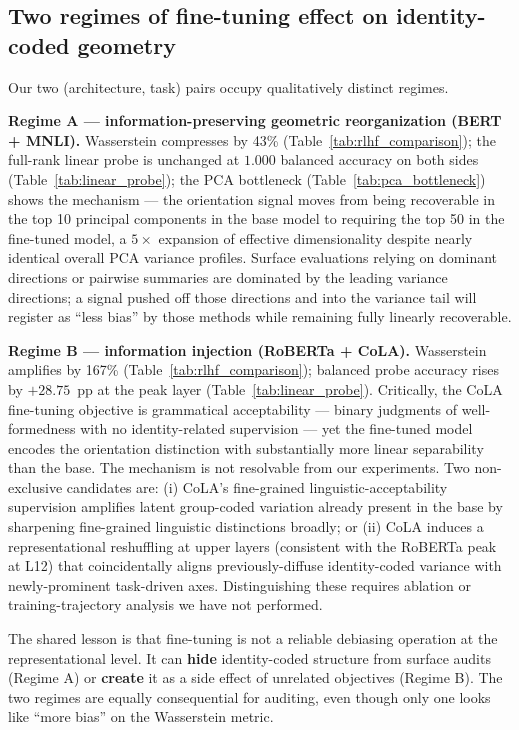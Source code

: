 \documentclass[11pt]{article}
\begin{document}
\subsection{Two regimes of fine-tuning effect on identity-coded geometry}\label{sec:regimes}

Our two (architecture, task) pairs occupy qualitatively distinct regimes.

\textbf{Regime A --- information-preserving geometric reorganization (BERT + MNLI).} Wasserstein compresses by 43\% (Table~\ref{tab:rlhf_comparison}); the full-rank linear probe is unchanged at $1.000$ balanced accuracy on both sides (Table~\ref{tab:linear_probe}); the PCA bottleneck (Table~\ref{tab:pca_bottleneck}) shows the mechanism --- the orientation signal moves from being recoverable in the top 10 principal components in the base model to requiring the top 50 in the fine-tuned model, a $5\times$ expansion of effective dimensionality despite nearly identical overall PCA variance profiles. Surface evaluations relying on dominant directions or pairwise summaries \citep{bolukbasi2016man, caliskan2017semantics, may-etal-2019-measuring} are dominated by the leading variance directions; a signal pushed off those directions and into the variance tail will register as ``less bias'' by those methods while remaining fully linearly recoverable.

\textbf{Regime B --- information injection (RoBERTa + CoLA).} Wasserstein amplifies by 167\% (Table~\ref{tab:rlhf_comparison}); balanced probe accuracy rises by $+28.75$~pp at the peak layer (Table~\ref{tab:linear_probe}). Critically, the CoLA fine-tuning objective is grammatical acceptability --- binary judgments of well-formedness with no identity-related supervision --- yet the fine-tuned model encodes the orientation distinction with substantially more linear separability than the base. The mechanism is not resolvable from our experiments. Two non-exclusive candidates are: (i) CoLA's fine-grained linguistic-acceptability supervision amplifies latent group-coded variation already present in the base by sharpening fine-grained linguistic distinctions broadly; or (ii) CoLA induces a representational reshuffling at upper layers (consistent with the RoBERTa peak at L12) that coincidentally aligns previously-diffuse identity-coded variance with newly-prominent task-driven axes. Distinguishing these requires ablation or training-trajectory analysis we have not performed.

The shared lesson is that fine-tuning is not a reliable debiasing operation at the representational level. It can \textbf{hide} identity-coded structure from surface audits (Regime A) or \textbf{create} it as a side effect of unrelated objectives (Regime B). The two regimes are equally consequential for auditing, even though only one looks like ``more bias'' on the Wasserstein metric.
\end{document}
